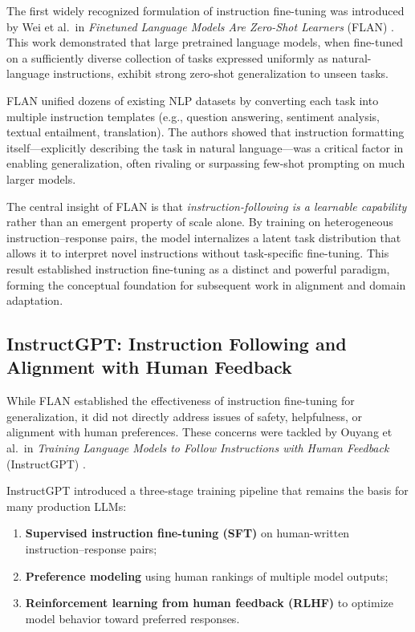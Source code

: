 \documentclass[unnumsec,webpdf,contemporary,large]{oup-authoring-template}
\theoremstyle{thmstyleone}
\theoremstyle{thmstyletwo}
\theoremstyle{thmstylethree}
\begin{document}
The first widely recognized formulation of instruction fine-tuning was introduced by Wei et al.\ in \emph{Finetuned Language Models Are Zero-Shot Learners} (FLAN) \cite{wei2022flan}. This work demonstrated that large pretrained language models, when fine-tuned on a sufficiently diverse collection of tasks expressed uniformly as natural-language instructions, exhibit strong zero-shot generalization to unseen tasks.

FLAN unified dozens of existing NLP datasets by converting each task into multiple instruction templates (e.g., question answering, sentiment analysis, textual entailment, translation). The authors showed that instruction formatting itself---explicitly describing the task in natural language---was a critical factor in enabling generalization, often rivaling or surpassing few-shot prompting on much larger models.

The central insight of FLAN is that \emph{instruction-following is a learnable capability} rather than an emergent property of scale alone. By training on heterogeneous instruction--response pairs, the model internalizes a latent task distribution that allows it to interpret novel instructions without task-specific fine-tuning. This result established instruction fine-tuning as a distinct and powerful paradigm, forming the conceptual foundation for subsequent work in alignment and domain adaptation.

\subsection{InstructGPT: Instruction Following and Alignment with Human Feedback}
\label{sec:ift-instructgpt}

While FLAN established the effectiveness of instruction fine-tuning for generalization, it did not directly address issues of safety, helpfulness, or alignment with human preferences. These concerns were tackled by Ouyang et al.\ in \emph{Training Language Models to Follow Instructions with Human Feedback} (InstructGPT) \cite{ouyang2022instructgpt}.

InstructGPT introduced a three-stage training pipeline that remains the basis for many production LLMs:
\begin{enumerate}
  \item \textbf{Supervised instruction fine-tuning (SFT)} on human-written instruction--response pairs;
  \item \textbf{Preference modeling} using human rankings of multiple model outputs;
  \item \textbf{Reinforcement learning from human feedback (RLHF)} to optimize model behavior toward preferred responses.
\end{enumerate}
\end{document}
